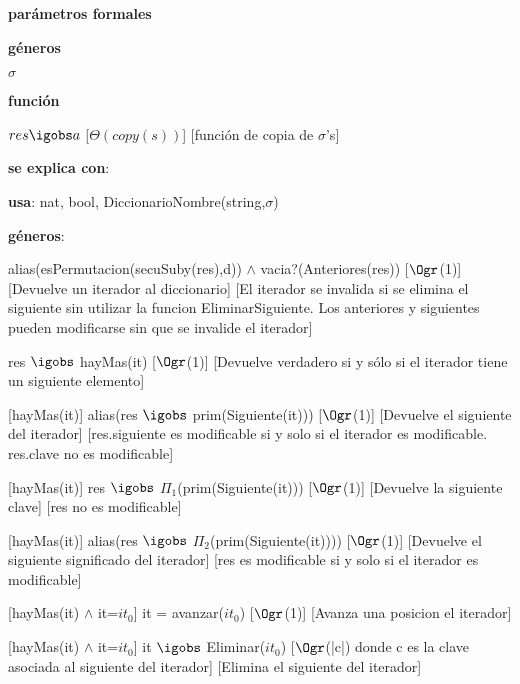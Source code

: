 \begin{Interfaz}

	\textbf{parámetros formales}\parindent\\
	\parbox{1.7cm}{\textbf{géneros}} $\sigma$\\
	\parbox[t]{1.7cm}{\textbf{función}}\parbox[t]{\textwidth-2\parindent-1.7cm}{%
	    	{$res \igobs a$}
		[$\Theta(copy(s))$]
		[función de copia de $\sigma$'s]
	}
	
	\textbf{se explica con}: 
	
	\textbf{usa}: nat, bool, DiccionarioNombre(string,$\sigma$)
	
	\textbf{géneros}: 
	
	
	{alias(esPermutacion(secuSuby(res),d)) $\land$ vacia?(Anteriores(res))}
	[$\Ogr$(1)]
	[Devuelve un iterador al diccionario]
	[El iterador se invalida si se elimina el siguiente sin utilizar la funcion EliminarSiguiente. Los anteriores y siguientes pueden modificarse sin que se invalide el iterador]
	
	{res $\igobs$ hayMas(it)}	
	[$\Ogr$(1)]
	[Devuelve verdadero si y sólo si el iterador tiene un siguiente elemento]
	
	[hayMas(it)]
	{alias(res $\igobs$ prim(Siguiente(it)))}
	[$\Ogr$(1)]
	[Devuelve el siguiente del iterador]
	[res.siguiente es modificable si y solo si el iterador es modificable. res.clave no es modificable]
	
	[hayMas(it)]
	{res $\igobs$ $\Pi_1$(prim(Siguiente(it)))}
	[$\Ogr$(1)]
	[Devuelve la siguiente clave]
	[res no es modificable]
	
	[hayMas(it)]
	{alias(res $\igobs$ $\Pi_2$(prim(Siguiente(it))))}
	[$\Ogr$(1)]
	[Devuelve el siguiente significado del iterador]
	[res es modificable si y solo si el iterador es modificable]
		
	[hayMas(it) $\land$ it=$it_0$]
	{it = avanzar($it_0$)}	
	[$\Ogr$(1)]
	[Avanza una posicion el iterador]
	
	[hayMas(it) $\land$ it=$it_0$]
	{it $\igobs$ Eliminar($it_0$)}
	[$\Ogr$(|c|) donde c es la clave asociada al siguiente del iterador]
	[Elimina el siguiente del iterador]


\end{Interfaz}


